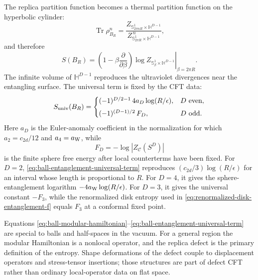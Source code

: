 The replica partition function becomes a thermal partition function on the
hyperbolic cylinder:
\begin{equation}
  \operatorname{Tr}\rho_{B_R}^n
  =
  \frac{
    Z_{\mathbb S^1_{2\pi nR}\times\mathbb H^{D-1}}
  }{
    Z_{\mathbb S^1_{2\pi R}\times\mathbb H^{D-1}}^{\,n}
  },
  \label{eq:ball-replica-hyperbolic-thermal}
\end{equation}
and therefore
\begin{equation}
  S(B_R)
  =
  \left.
  \left(1-\beta\frac{\partial}{\partial\beta}\right)
  \log Z_{\mathbb S^1_\beta\times\mathbb H^{D-1}}
  \right|_{\beta=2\pi R}.
  \label{eq:ball-entanglement-thermal-entropy}
\end{equation}
The infinite volume of \(\mathbb H^{D-1}\) reproduces the ultraviolet
divergences near the entangling surface.  The universal term is fixed by the
CFT data:
\begin{equation}
  S_{\rm univ}(B_R)
  =
  \begin{cases}
  (-1)^{D/2-1}\,4a_D\log(R/\epsilon), & D\ \hbox{even},\\[4pt]
  (-1)^{(D-1)/2}\,F_D, & D\ \hbox{odd}.
  \end{cases}
  \label{eq:ball-entanglement-universal-term}
\end{equation}
Here \(a_D\) is the Euler-anomaly coefficient in the normalization for which
\(a_2=c_{2d}/12\) and \(a_4=a_{\rm W}\), while
\[
  F_D=-\log|Z_{\mathcal C}(S^D)|
\]
is the finite sphere free energy after local counterterms have been fixed.
For \(D=2\), \eqref{eq:ball-entanglement-universal-term} reproduces
\((c_{2d}/3)\log(R/\epsilon)\) for an interval whose length is proportional to
\(R\).  For \(D=4\), it gives the sphere-entanglement logarithm
\(-4a_{\rm W}\log(R/\epsilon)\).  For \(D=3\), it gives the universal constant
\(-F_3\), while the renormalized disk entropy used in
\eqref{eq:renormalized-disk-entanglement-f} equals \(F_3\) at a conformal
fixed point.

Equations \eqref{eq:ball-modular-hamiltonian}--\eqref{eq:ball-entanglement-universal-term}
are special to balls and half-spaces in the vacuum.  For a general region the
modular Hamiltonian is a nonlocal operator, and the replica defect is the
primary definition of the entropy.  Shape deformations of the defect couple to
displacement operators and stress-tensor insertions; those structures are
part of defect CFT rather than ordinary local-operator data on flat space.
